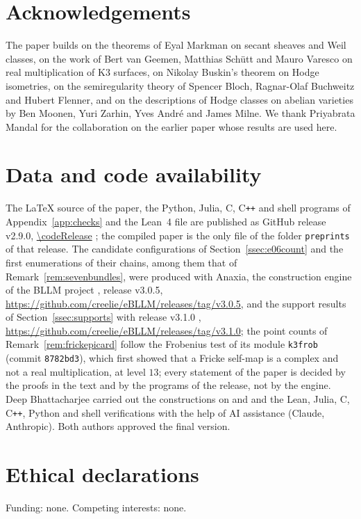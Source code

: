 \section*{Acknowledgements}
The paper builds on the theorems of Eyal Markman on secant sheaves and Weil classes, on the work of Bert van Geemen, Matthias Sch\"utt and Mauro Varesco on real multiplication of K3 surfaces, on Nikolay Buskin's theorem on Hodge isometries, on the semiregularity theory of Spencer Bloch, Ragnar-Olaf Buchweitz and Hubert Flenner, and on the descriptions of Hodge classes on abelian varieties by Ben Moonen, Yuri Zarhin, Yves Andr\'e and James Milne. We thank Priyabrata Mandal for the collaboration on the earlier paper \cite{BMB26} whose results are used here.

\section*{Data and code availability}
The \LaTeX{} source of the paper, the Python, Julia, C, C\texttt{++} and shell programs of Appendix~\ref{app:checks} and the Lean~4 file are published as GitHub release v2.9.0, \url{\codeRelease} \cite{BB26code}; the compiled paper is the only file of the folder \texttt{preprints} of that release. The candidate configurations of Section~\ref{ssec:e06count} and the first enumerations of their chains, among them that of Remark~\ref{rem:sevenbundles}, were produced with Anaxia, the construction engine of the BLLM project \cite{Bha26bllm}, release v3.0.5, \url{https://github.com/creelie/eBLLM/releases/tag/v3.0.5}, and the support results of Section~\ref{ssec:supports} with release v3.1.0 \cite{Bha26bllmb}, \url{https://github.com/creelie/eBLLM/releases/tag/v3.1.0}; the point counts of Remark~\ref{rem:frickepicard} follow the Frobenius test of its module \texttt{k3frob} (commit \texttt{8782bd3}), which first showed that a Fricke self-map is a complex and not a real multiplication, at level $13$; every statement of the paper is decided by the proofs in the text and by the programs of the release, not by the engine. Deep Bhattacharjee carried out the constructions on \Fii{} and \Fiii{} and the Lean, Julia, C, C\texttt{++}, Python and shell verifications with the help of AI assistance (Claude, Anthropic). Both authors approved the final version.

\section*{Ethical declarations}
Funding: none. Competing interests: none.
